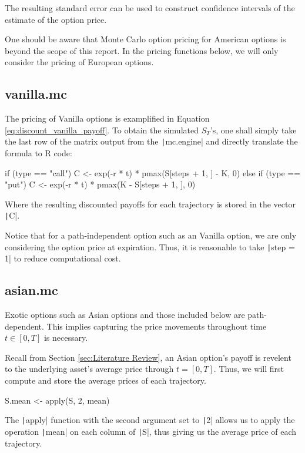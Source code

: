 The resulting standard error can be used to construct confidence intervals of the estimate of the option price.

One should be aware that Monte Carlo option pricing for American options is beyond the scope of this report. In the pricing functions below, we will only consider the pricing of European options.

\subsection{vanilla.mc}

The pricing of Vanilla options is examplified in Equation \ref{eq:discount_vanilla_payoff}. To obtain the simulated $S_T$'s, one shall simply take the last row of the matrix output from the \texttt|mc.engine| and directly translate the formula to R code:

\begin{Rminted}
if (type == "call") {
    C <- exp(-r * t) * pmax(S[steps + 1, ] - K, 0)
} else if (type == "put") {
    C <- exp(-r * t) * pmax(K - S[steps + 1, ], 0)
}
\end{Rminted}

Where the resulting discounted payoffs for each trajectory is stored in the vector \texttt|C|.

Notice that for a path-independent option such as an Vanilla option, we are only considering the option price at expiration. Thus, it is reasonable to take \texttt|step = 1| to reduce computational cost.

\subsection{asian.mc}

Exotic options such as Asian options and those included below are path-dependent. This implies capturing the price movements throughout time $t\in[0,T]$ is necessary.

Recall from Section \ref{sec:Literature Review}, an Asian option's payoff is revelent to the underlying asset's average price through $t=[0,T]$. Thus, we will first compute and store the average prices of each trajectory.

\begin{Rminted}
S.mean <- apply(S, 2, mean)
\end{Rminted}

The \texttt|apply| function with the second argument set to \texttt|2| allows us to apply the operation \texttt|mean| on each column of \texttt|S|, thus giving us the average price of each trajectory.


